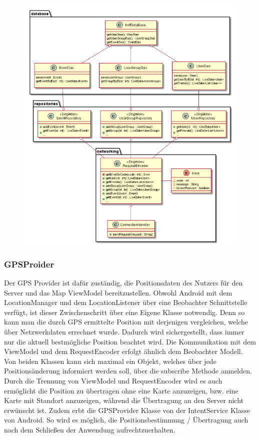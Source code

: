 \documentclass[parskip=full,11pt]{scrartcl}
\begin{document}
\begin{figure}
	\centering
	\includegraphics[width = \columnwidth]{model.png}
	\label{fig:model}
\end{figure}

\pagebreak
\subsubsection{GPSProider}

Der GPS Provider ist dafür zuständig, die Positionsdaten des Nutzers für den
Server und das Map ViewModel bereitzustellen. Obwohl Android mit dem
LocationManager und dem LocationListener über eine Beobachter Schnittstelle
verfügt, ist dieser Zwischenschritt über eine Eigene Klasse notwendig. Denn so
kann man die durch GPS ermittelte Position mit derjenigen vergleichen, welche
über Netzwerkdaten errechnet wurde. Dadurch wird sichergestellt, dass immer
nur die aktuell bestmögliche Position beachtet wird. Die Kommunikation mit dem
ViewModel und dem RequestEncoder erfolgt ähnlich dem Beobachter Modell. Von
beiden Klassen kann sich maximal ein Objekt, welches über jede
Positionsänderung informiert werden soll, über die subscribe Methode anmelden.
Durch die Trennung von ViewModel und RequestEncoder wird es auch ermöglicht die
Position zu übertragen ohne eine Karte anzuzeigen, bzw. eine Karte mit Standort
anzuzeigen, während die Übertragung an den Server nicht erwünscht ist. Zudem
erbt die GPSProvider Klasse von der IntentService Klasse von Android. So wird es
möglich, die Positionsbestimmung / Übertragung auch nach dem Schließen der
Anwendung aufrechtzuerhalten.
\end{document}
